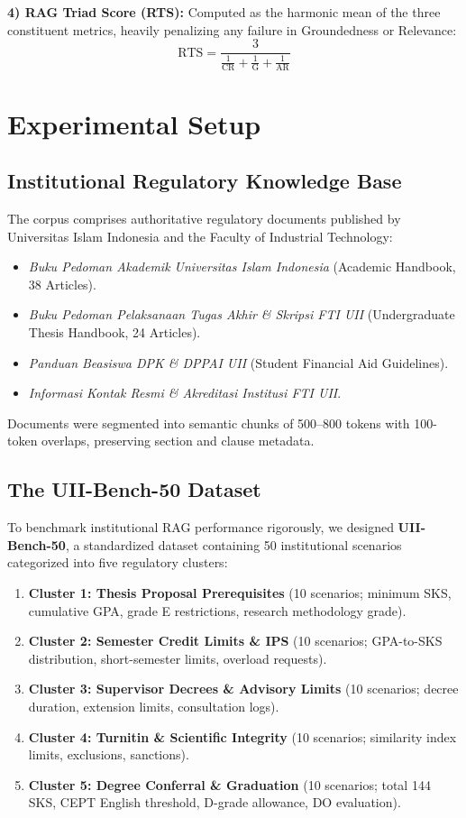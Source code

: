 \documentclass[conference]{IEEEtran}
\begin{document}
\textbf{4) RAG Triad Score (RTS):} Computed as the harmonic mean of the three constituent metrics, heavily penalizing any failure in Groundedness or Relevance:
\begin{equation}
\text{RTS} = \frac{3}{\frac{1}{\text{CR}} + \frac{1}{\text{G}} + \frac{1}{\text{AR}}}
\end{equation}

\section{Experimental Setup}

\subsection{Institutional Regulatory Knowledge Base}
The corpus comprises authoritative regulatory documents published by Universitas Islam Indonesia and the Faculty of Industrial Technology:
\begin{itemize}
    \item \textit{Buku Pedoman Akademik Universitas Islam Indonesia} (Academic Handbook, 38 Articles).
    \item \textit{Buku Pedoman Pelaksanaan Tugas Akhir \& Skripsi FTI UII} (Undergraduate Thesis Handbook, 24 Articles).
    \item \textit{Panduan Beasiswa DPK \& DPPAI UII} (Student Financial Aid Guidelines).
    \item \textit{Informasi Kontak Resmi \& Akreditasi Institusi FTI UII}.
\end{itemize}
Documents were segmented into semantic chunks of 500--800 tokens with 100-token overlaps, preserving section and clause metadata.

\subsection{The UII-Bench-50 Dataset}
To benchmark institutional RAG performance rigorously, we designed \textbf{UII-Bench-50}, a standardized dataset containing 50 institutional scenarios categorized into five regulatory clusters:
\begin{enumerate}
    \item \textbf{Cluster 1: Thesis Proposal Prerequisites} (10 scenarios; minimum SKS, cumulative GPA, grade E restrictions, research methodology grade).
    \item \textbf{Cluster 2: Semester Credit Limits \& IPS} (10 scenarios; GPA-to-SKS distribution, short-semester limits, overload requests).
    \item \textbf{Cluster 3: Supervisor Decrees \& Advisory Limits} (10 scenarios; decree duration, extension limits, consultation logs).
    \item \textbf{Cluster 4: Turnitin \& Scientific Integrity} (10 scenarios; similarity index limits, exclusions, sanctions).
    \item \textbf{Cluster 5: Degree Conferral \& Graduation} (10 scenarios; total 144 SKS, CEPT English threshold, D-grade allowance, DO evaluation).
\end{enumerate}
\end{document}
